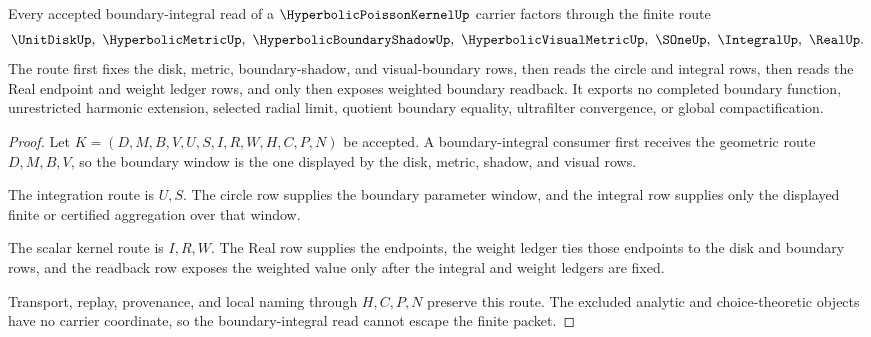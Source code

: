 \begin{theorem}
\label{thm:hyperbolic-poisson-kernel-boundary-integral-nonescape}
Every accepted boundary-integral read of a $\HyperbolicPoissonKernelUp$ carrier factors through the finite route
$$
\UnitDiskUp,\ \HyperbolicMetricUp,\ \HyperbolicBoundaryShadowUp,\ \HyperbolicVisualMetricUp,\ \SOneUp,\ \IntegralUp,\ \RealUp .
$$
The route first fixes the disk, metric, boundary-shadow, and visual-boundary rows, then reads the circle and integral rows, then reads the Real endpoint and weight ledger rows, and only then exposes weighted boundary readback. It exports no completed boundary function, unrestricted harmonic extension, selected radial limit, quotient boundary equality, ultrafilter convergence, or global compactification.
\end{theorem}
\begin{proof}
Let $K=(D,M,B,V,U,S,I,R,W,H,C,P,N)$ be accepted. A boundary-integral consumer first receives the geometric route $D,M,B,V$, so the boundary window is the one displayed by the disk, metric, shadow, and visual rows.

The integration route is $U,S$. The circle row supplies the boundary parameter window, and the integral row supplies only the displayed finite or certified aggregation over that window.

The scalar kernel route is $I,R,W$. The Real row supplies the endpoints, the weight ledger ties those endpoints to the disk and boundary rows, and the readback row exposes the weighted value only after the integral and weight ledgers are fixed.

Transport, replay, provenance, and local naming through $H,C,P,N$ preserve this route. The excluded analytic and choice-theoretic objects have no carrier coordinate, so the boundary-integral read cannot escape the finite packet.
\end{proof}



